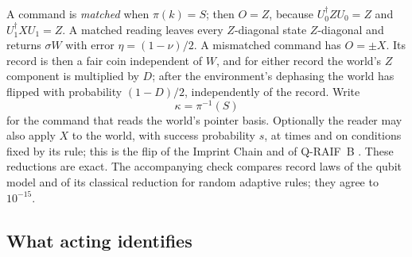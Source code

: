 \documentclass[11pt,a4paper]{article}
\begin{document}
A command is \emph{matched} when $\pi(k)=S$; then $O=Z$, because $U_0^\dagger ZU_0=Z$ and $U_1^\dagger XU_1=Z$. A matched reading leaves every $Z$-diagonal state $Z$-diagonal and returns $\sigma W$ with error $\eta=(1-\nu)/2$. A mismatched command has $O=\pm X$. Its record is then a fair coin independent of $W$, and for either record the world's $Z$ component is multiplied by $D$; after the environment's dephasing the world has flipped with probability $(1-D)/2$, independently of the record. Write
\[
 \kappa=\pi^{-1}(S)
\]
for the command that reads the world's pointer basis. Optionally the reader may also apply $X$ to the world, with success probability $s$, at times and on conditions fixed by its rule; this is the flip of the Imprint Chain and of Q-RAIF~B \cite{ImprintChain,QRAIFB}. These reductions are exact. The accompanying check compares record laws of the qubit model and of its classical reduction for random adaptive rules; they agree to $10^{-15}$.

\subsection{What acting identifies}
\end{document}
